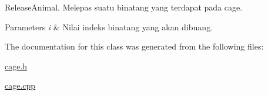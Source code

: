 Release\+Animal. Melepas suatu binatang yang terdapat pada cage. 


\begin{DoxyParams}{Parameters}
{\em i} & Nilai indeks binatang yang akan dibuang. \\
\hline
\end{DoxyParams}


The documentation for this class was generated from the following files\+:\begin{DoxyCompactItemize}
\item 
\hyperlink{cage_8h}{cage.\+h}\item 
\hyperlink{cage_8cpp}{cage.\+cpp}\end{DoxyCompactItemize}
